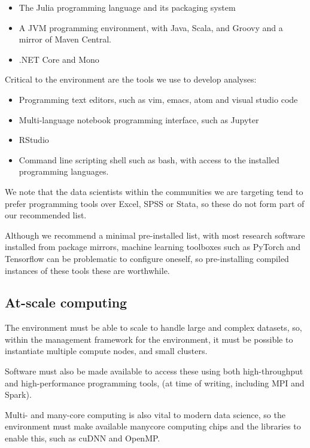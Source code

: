 \documentclass[10pt,a4paper,twocolumn]{article}
\begin{document}
\begin{itemize}
    \item The Julia programming language and its packaging system
    \item A JVM programming environment, with Java, Scala, and Groovy and a mirror of Maven Central.
    \item .NET Core and Mono
\end{itemize}

Critical to the environment are the tools we use to develop analyses:

\begin{itemize}
    \item Programming text editors, such as vim, emacs, atom and visual studio code
    \item Multi-language notebook programming interface, such as Jupyter
    \item RStudio
    \item Command line scripting shell such as bash, with access to the installed programming languages.
\end{itemize}
    
We note that the  data scientists within the communities we are targeting tend to prefer programming tools over Excel, SPSS or Stata, so these do not form part of our recommended list.

Although we recommend a minimal pre-installed list, with most research software installed from package mirrors, machine learning toolboxes such as PyTorch and Tensorflow
can be problematic to configure oneself, so pre-installing compiled instances of these tools these are worthwhile.

\subsection{At-scale computing}

The environment must be able to scale to handle large and complex datasets, so, within the management framework for the environment, it must be possible
to instantiate multiple compute nodes, and small clusters.

Software must also be made available to access these using both high-throughput and high-performance programming tools, (at time of writing, including MPI and Spark). 

Multi- and many-core computing is also vital to modern data science, so the environment must make available
manycore computing chips and the libraries to
enable this, such as cuDNN and OpenMP.
\end{document}
